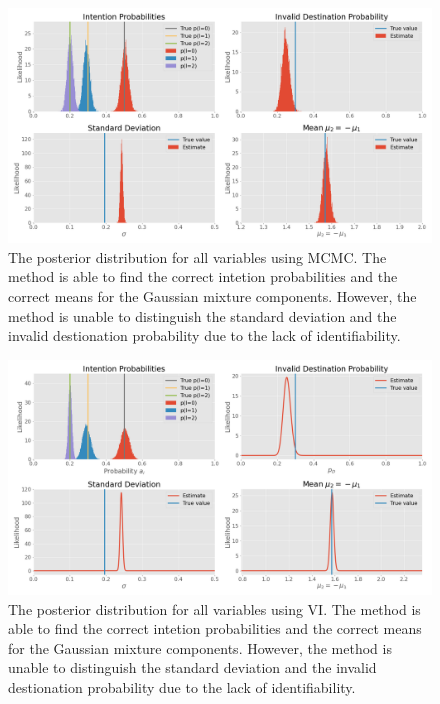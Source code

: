 \begin{figure}[h]
    \centering
    \includegraphics[width=\textwidth]{figures/example_mcmc.png}
    \caption{The posterior distribution for all variables using MCMC. The method is able to find the correct intetion probabilities and the correct means for the Gaussian mixture components. However, the method is unable to distinguish the standard deviation and the invalid destionation probability due to the lack of identifiability.}
    \label{fig:example_mcmc_posterior}
\end{figure}


\begin{figure}[h]
    \centering
    \includegraphics[width=\textwidth]{figures/example_vi.png}
    \caption{The posterior distribution for all variables using VI. The method is able to find the correct intetion probabilities and the correct means for the Gaussian mixture components. However, the method is unable to distinguish the standard deviation and the invalid destionation probability due to the lack of identifiability.}
    \label{fig:example_vi_posterior}
\end{figure}

